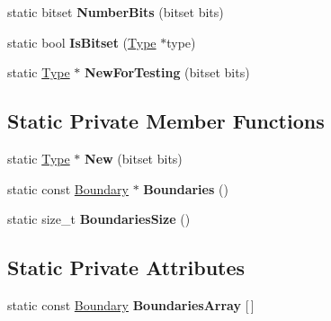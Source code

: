 \begin{DoxyCompactItemize}
\item 
static bitset {\bfseries Number\+Bits} (bitset bits)\hypertarget{classv8_1_1internal_1_1_bitset_type_a7ed256bdc5a2d58255cd9b6e41a43704}{}\label{classv8_1_1internal_1_1_bitset_type_a7ed256bdc5a2d58255cd9b6e41a43704}

\item 
static bool {\bfseries Is\+Bitset} (\hyperlink{classv8_1_1internal_1_1_type}{Type} $\ast$type)\hypertarget{classv8_1_1internal_1_1_bitset_type_aa42897f6ec8a66c7325fc43c1a8c5672}{}\label{classv8_1_1internal_1_1_bitset_type_aa42897f6ec8a66c7325fc43c1a8c5672}

\item 
static \hyperlink{classv8_1_1internal_1_1_type}{Type} $\ast$ {\bfseries New\+For\+Testing} (bitset bits)\hypertarget{classv8_1_1internal_1_1_bitset_type_ac2b1b66d5537b55f8f782aa64986caee}{}\label{classv8_1_1internal_1_1_bitset_type_ac2b1b66d5537b55f8f782aa64986caee}

\end{DoxyCompactItemize}
\subsection*{Static Private Member Functions}
\begin{DoxyCompactItemize}
\item 
static \hyperlink{classv8_1_1internal_1_1_type}{Type} $\ast$ {\bfseries New} (bitset bits)\hypertarget{classv8_1_1internal_1_1_bitset_type_ad77d9b59cd590937ed8a9e08873aaf9d}{}\label{classv8_1_1internal_1_1_bitset_type_ad77d9b59cd590937ed8a9e08873aaf9d}

\item 
static const \hyperlink{structv8_1_1internal_1_1_bitset_type_1_1_boundary}{Boundary} $\ast$ {\bfseries Boundaries} ()\hypertarget{classv8_1_1internal_1_1_bitset_type_a89947b5d15e52b20afbf2d094eb4ac7a}{}\label{classv8_1_1internal_1_1_bitset_type_a89947b5d15e52b20afbf2d094eb4ac7a}

\item 
static size\+\_\+t {\bfseries Boundaries\+Size} ()\hypertarget{classv8_1_1internal_1_1_bitset_type_affae47bc48970e4c396ff8c5559c3bd5}{}\label{classv8_1_1internal_1_1_bitset_type_affae47bc48970e4c396ff8c5559c3bd5}

\end{DoxyCompactItemize}
\subsection*{Static Private Attributes}
\begin{DoxyCompactItemize}
\item 
static const \hyperlink{structv8_1_1internal_1_1_bitset_type_1_1_boundary}{Boundary} {\bfseries Boundaries\+Array} \mbox{[}$\,$\mbox{]}
\end{DoxyCompactItemize}
